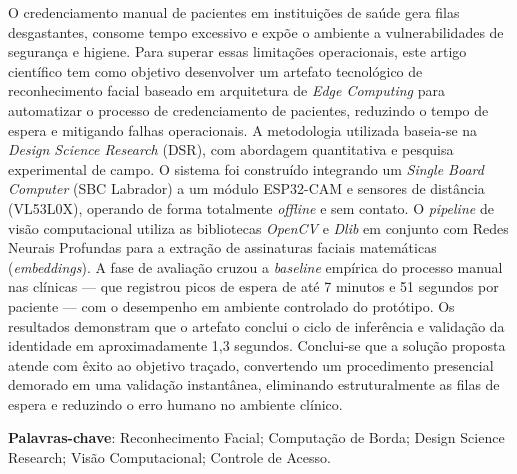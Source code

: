 \begin{resumo}
    O credenciamento manual de pacientes em instituições de saúde gera filas desgastantes, consome tempo excessivo e expõe o ambiente a vulnerabilidades de segurança e higiene. Para superar essas limitações operacionais, este artigo científico tem como objetivo desenvolver um artefato tecnológico de reconhecimento facial baseado em arquitetura de \textit{Edge Computing} para automatizar o processo de credenciamento de pacientes, reduzindo o tempo de espera e mitigando falhas operacionais. A metodologia utilizada baseia-se na \textit{Design Science Research }(DSR), com abordagem quantitativa e pesquisa experimental de campo. O sistema foi construído integrando um \textit{Single Board Computer} (SBC Labrador) a um módulo ESP32-CAM e sensores de distância (VL53L0X), operando de forma totalmente \textit{offline} e sem contato. O \textit{pipeline} de visão computacional utiliza as bibliotecas \textit{OpenCV} e \textit{Dlib} em conjunto com Redes Neurais Profundas para a extração de assinaturas faciais matemáticas (\textit{embeddings}). A fase de avaliação cruzou a \textit{baseline} empírica do processo manual nas clínicas — que registrou picos de espera de até 7 minutos e 51 segundos por paciente — com o desempenho em ambiente controlado do protótipo. Os resultados demonstram que o artefato conclui o ciclo de inferência e validação da identidade em aproximadamente 1,3 segundos. Conclui-se que a solução proposta atende com êxito ao objetivo traçado, convertendo um procedimento presencial demorado em uma validação instantânea, eliminando estruturalmente as filas de espera e reduzindo o erro humano no ambiente clínico.
    
    \vspace{\onelineskip}
    \noindent
    \textbf{Palavras-chave}: Reconhecimento Facial; Computação de Borda; Design Science Research; Visão Computacional; Controle de Acesso.
\end{resumo}

